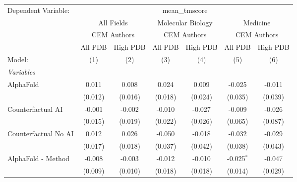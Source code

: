 \begingroup
\centering
\begin{tabular}{lcccccc}
   \tabularnewline \midrule \midrule
   Dependent Variable: & \multicolumn{6}{c}{mean\_tmscore}\\
 & \multicolumn{2}{c}{All Fields} & \multicolumn{2}{c}{Molecular Biology} & \multicolumn{2}{c}{Medicine} \\
\cmidrule(lr){2-3} \cmidrule(lr){4-5} \cmidrule(lr){6-7}
 & \multicolumn{2}{c}{CEM Authors} & \multicolumn{2}{c}{CEM Authors} & \multicolumn{2}{c}{CEM Authors} \\
\cmidrule(lr){2-3} \cmidrule(lr){4-5} \cmidrule(lr){6-7}
 & \multicolumn{1}{c}{All PDB} & \multicolumn{1}{c}{High PDB} & \multicolumn{1}{c}{All PDB} & \multicolumn{1}{c}{High PDB} & \multicolumn{1}{c}{All PDB} & \multicolumn{1}{c}{High PDB} \\
\cmidrule(lr){2-2} \cmidrule(lr){3-3} \cmidrule(lr){4-4} \cmidrule(lr){5-5} \cmidrule(lr){6-6} \cmidrule(lr){7-7}
   Model:                                                     & (1)         & (2)         & (3)         & (4)     & (5)          & (6)\\  
   \midrule
   \emph{Variables}\\
   AlphaFold                                                  & 0.011       & 0.008       & 0.024       & 0.009   & -0.025       & -0.011\\   
                                                              & (0.012)     & (0.016)     & (0.018)     & (0.024) & (0.035)      & (0.039)\\   
   Counterfactual AI                                          & -0.001      & -0.002      & -0.010      & -0.027  & -0.009       & -0.026\\   
                                                              & (0.015)     & (0.019)     & (0.022)     & (0.026) & (0.065)      & (0.087)\\   
   Counterfactual No AI                                       & 0.012       & 0.026       & -0.050      & -0.018  & -0.032       & -0.029\\   
                                                              & (0.017)     & (0.018)     & (0.037)     & (0.042) & (0.038)      & (0.043)\\   
   AlphaFold - Method                                         & -0.008      & -0.003      & -0.012      & -0.010  & -0.025$^{*}$ & -0.047\\   
                                                              & (0.009)     & (0.010)     & (0.018)     & (0.018) & (0.014)      & (0.029)\\   

\end{tabular}
